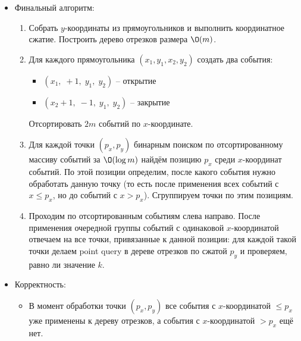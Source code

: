 \begin{enumerate}
\begin{itemize}
      \begin{itemize}
        \item Обновление отрезка $[l, r]$ на $+\delta$: добавляем $\delta$ в поле $lazy$ вершины, покрывающей нужный отрезок

        \item Запрос в точке $i$: спускаемся до листа, проталкивая отложенные обновления, и возвращаем значение
      \end{itemize}

      \item Финальный алгоритм:

      \begin{enumerate}

        \item Собрать $y$-координаты из прямоугольников и выполнить координатное сжатие. Построить дерево отрезков размера $\O(m)$.

        \item Для каждого прямоугольника $(x_1, y_1, x_2, y_2)$ создать два события:
        \begin{itemize}
          \item $(x_1,\; +1,\; y_1,\; y_2)$ -- открытие
          \item $(x_2 + 1,\; -1,\; y_1,\; y_2)$ -- закрытие
        \end{itemize}
        Отсортировать $2m$ событий по $x$-координате.

        \item Для каждой точки $(p_x, p_y)$ бинарным поиском по отсортированному массиву событий за $\O(\log m)$
        найдём позицию $p_x$ среди $x$-координат событий. По этой позиции определим, после какого события нужно обработать данную точку
         (то есть после применения всех событий с $x \leq p_x$, но до событий с $x > p_x$). Сгруппируем точки по этим позициям.

        \item Проходим по отсортированным событиям слева направо. После применения очередной группы событий с одинаковой $x$-координатой
        отвечаем на все точки, привязанные к данной позиции: для каждой такой точки делаем point query в дереве отрезков по сжатой $p_y$ и проверяем, 
        равно ли значение $k$.

      \end{enumerate}

      \item Корректность:
      \begin{itemize}
        \item В момент обработки точки $(p_x, p_y)$ все события с $x$-координатой $\leq p_x$ уже применены к дереву отрезков, 
        а события с $x$-координатой $> p_x$ ещё нет.
        

\end{itemize}
\end{itemize}
\end{enumerate}
